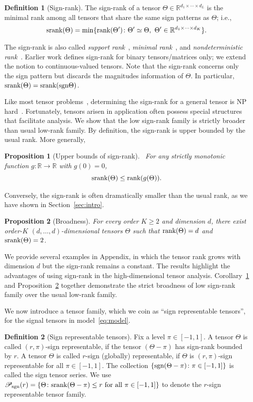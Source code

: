 \documentclass{article}
\theoremstyle{plain}
\newtheorem{prop}{Proposition}
\theoremstyle{definition}
\newtheorem{defn}{Definition}
\def\sign{\textup{sgn}}
\def\srank{\textup{srank}}
\def\rank{\textup{rank}}
\def\caliP{\mathscr{P}_{\textup{sgn}}}
\begin{document}
\begin{defn}[Sign-rank]
The sign-rank of a tensor $\Theta\in\mathbb{R}^{d_1\times \cdots \times d_L}$ is the minimal rank among all tensors that share the same sign patterns as $\Theta$; i.e.,
\[
\srank(\Theta) = \min \{\rank(\Theta')\colon  \Theta'\simeq \Theta,\ \Theta'\in\mathbb{R}^{d_1\times \cdots \times d_K}\}.
\]
\end{defn}
The sign-rank is also called \emph{support rank}~\cite{cohn2013fast}, \emph{minimal rank}~\cite{alon2016sign}, and \emph{nondeterministic rank}~\cite{de2003nondeterministic}. Earlier work defines sign-rank for binary tensors/matrices only; we extend the notion to continuous-valued tensors. Note that the sign-rank concerns only the sign pattern but discards the magnitudes information of $\Theta$. In particular, $\srank(\Theta)=\srank(\sign \Theta)$. 

Like most tensor problems~\cite{hillar2013most}, determining the sign-rank for a general tensor is NP hard~\cite{alon2016sign}. Fortunately, tensors arisen in application often possess special structures that facilitate analysis. We show that the low sign-rank family is strictly broader than usual low-rank family. By definition, the sign-rank is upper bounded by the usual rank. More generally, 
\begin{prop}[Upper bounds of sign-rank]~\label{cor:monotonic} For any strictly monotonic function $g\colon \mathbb{R}\to \mathbb{R}$ with $g(0)=0$, 
\[
\textup{srank}(\Theta)\leq\rank(g(\Theta)).
\]
\end{prop}
Conversely, the sign-rank is often dramatically smaller than the usual rank, as we have shown in Section~\ref{sec:intro}.
\begin{prop}[Broadness]\label{prop:extention}For every order $K\geq 2$ and dimension $d$, there exist order-$K$ $(d,\ldots,d)$-dimensional tensors $\Theta$ such that $\rank(\Theta)=d$ and $\srank(\Theta)=2$.
\end{prop}
We provide several examples in Appendix, in which the tensor rank grows with dimension $d$ but the sign-rank remains a constant. The results highlight the advantages of using sign-rank in the high-dimensional tensor analysis. Corollary~\ref{cor:monotonic} and Proposition~\ref{prop:extention} together demonstrate the strict broadness of low sign-rank family over the usual low-rank family. 

We now introduce a tensor family, which we coin as ``sign representable tensors'', for the signal tensors in model~\eqref{eq:model}. 
\begin{defn}[Sign representable tensors] 
Fix a level $\pi\in[-1,1]$. A tensor $\Theta$ is called $(r,\pi)$-sign representable, if the tensor $(\Theta-\pi)$ has sign-rank bounded by $r$. A tensor $\Theta$ is called $r$-sign (globally) representable, if $\Theta$ is $(r,\pi)$-sign representable for all $\pi\in[-1,1]$. The collection $\{\sign(\Theta-\pi)\colon \pi \in[-1,1]\}$ is called the sign tensor series. 
We use $\caliP(r)=\{\Theta\colon \srank(\Theta-\pi)\leq r \text{ for all }\pi\in[-1,1]\}$ to denote the $r$-sign representable tensor family.
\end{defn}
\end{document}
